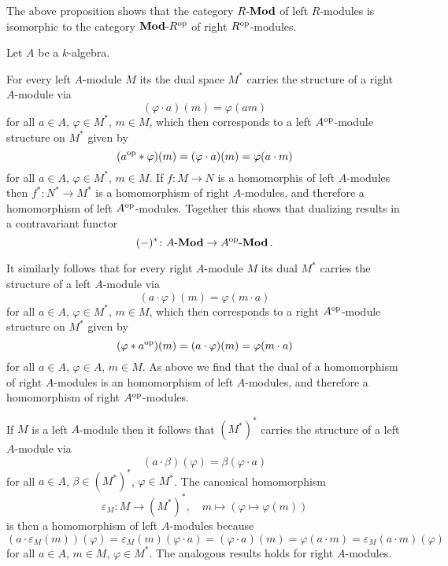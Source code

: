 \begin{remark}
  The above proposition shows that the category $R\text{-}\mathbf{Mod}$ of left $R$-modules is isomorphic to the category $\mathbf{Mod}\text{-}R^{\operatorname{op}}$ of right $R^{\operatorname{op}}$-modules.
\end{remark}


\begin{example}
  Let $A$ be a $k$-algebra.
  
  For every left $A$-module $M$ its the dual space $M^*$ carries the structure of a right $A$-module via
  \[
      (\varphi \cdot a)(m)
    = \varphi(am)
  \]
  for all $a \in A$, $\varphi \in M^*$, $m \in M$, which then corresponds to a left $A^{\operatorname{op}}$-module structure on $M^*$ given by
  \[
      (a^{\operatorname{op}} * \varphi)(m)
    = (\varphi \cdot a)(m)
    = \varphi(a \cdot m)
  \]
  for all $a \in A$, $\varphi \in M^*$, $m \in M$.
  If $f \colon M \to N$ is a homomorphis of left $A$-modules then $f^* \colon N^* \to M^*$ is a homomorphism of right $A$-modules, and therefore a homomorphism of left $A^{\operatorname{op}}$-modules.
  Together this shows that dualizing results in a contravariant functor
  \[
            (-)^*
    \colon  A\text{-}\mathbf{Mod}
    \to     A^{\operatorname{op}}\text{-}\mathbf{Mod} \,.
  \]
  
  It similarly follows that for every right $A$-module $M$ its dual $M^*$ carries the structure of a left $A$-module via
  \[
      (a \cdot \varphi)(m)
    = \varphi(m \cdot a)
  \]
  for all $a \in A$, $\varphi \in M^*$, $m \in M$, which then corresponds to a right $A^{\operatorname{op}}$-module structure on $M^*$ given by
  \[
      (\varphi * a^{\operatorname{op}})(m)
    = (a \cdot \varphi)(m)
    = \varphi(m \cdot a)
  \]
  for all $a \in A$, $\varphi \in A$, $m \in M$.
  As above we find that the dual of a homomorphism of right $A$-modules is an homomorphism of left $A$-modules, and therefore a homomorphism of right $A^{\operatorname{op}}$-modules.
  
  If $M$ is a left $A$-module then it follows that $(M^*)^*$ carries the structure of a left $A$-module via
  \[
      (a \cdot \beta)(\varphi)
    = \beta(\varphi \cdot a)
  \]
  for all $a \in A$, $\beta \in (M^*)^*$, $\varphi \in M^*$.
  The canonical homomorphism
  \[
            \varepsilon_M
    \colon  M
    \to     (M^*)^*,
    \quad   m
    \mapsto (\varphi \mapsto \varphi(m))
  \]
  is then a homomorphism of left $A$-modules because
  \[
      (a \cdot \varepsilon_M(m))(\varphi)
    = \varepsilon_M(m)(\varphi \cdot a)
    = (\varphi \cdot a)(m)
    = \varphi(a \cdot m)
    = \varepsilon_M(a \cdot m)(\varphi)
  \]
  for all $a \in A$, $m \in M$, $\varphi \in M^*$.
  The analogous results holds for right $A$-modules.


\end{example}
